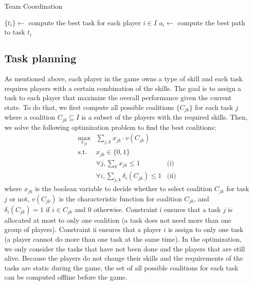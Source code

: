 \documentclass{aamas2014}
\begin{document}
\begin{algorithm}[t]
  \caption{Team Coordination}
  $\{ t_i \} \gets$ compute the best task for each player $i\in I$ \;
   {
    $a_i \gets$ compute the best path to task $t_i$ \;
  }
  \label{alg:coordination}
\end{algorithm}

\subsection{Task planning}
As mentioned above, each player in the game owns a type of skill
and each task requires players with a certain combination of the
skills. The goal is to assign a task to each player that maximize
the overall performance given the current state. To do that, we
first compute all possible coalitions $\{ C_{jk} \}$ for each task
$j$ where a coalition $C_{jk} \subseteq I$ is a subset of the
players with the required skills. Then, we solve the following
optimization problem to find the best coalitions:
\begin{equation}
  \begin{array}{lll}
    \max_{x_{jk}} & \sum_{j, k} x_{jk} \cdot v(C_{jk}) & \\
    \mbox{s.t.} & x_{jk} \in \{0, 1\} & \\
    & \forall j, \sum_{k} x_{jk} \leq 1 & \mbox{(i)} \\
    & \forall i, \sum_{j, k} \delta_i(C_{jk}) \leq 1 & \mbox{(ii)}
  \end{array}
  \label{eq:cf}
\end{equation}
where $x_{jk}$ is the boolean variable to decide whether to select
coalition $C_{jk}$ for task $j$ or not, $v(C_{jk})$ is the
characteristic function for coalition $C_{jk}$, and
$\delta_i(C_{jk}) = 1$ if $i\in C_{jk}$ and 0 otherwise. Constraint
i ensures that a task $j$ is allocated at most to only one
coalition (a task does not need more than one group of players).
Constraint ii ensures that a player $i$ is assign to only one task
(a player cannot do more than one task at the same time). In the
optimization, we only consider the tasks that have not been done
and the players that are still alive. Because the players do not
change their skills and the requirements of the tasks are static
during the game, the set of all possible coalitions for each task
can be computed offline before the game.
\end{document}
